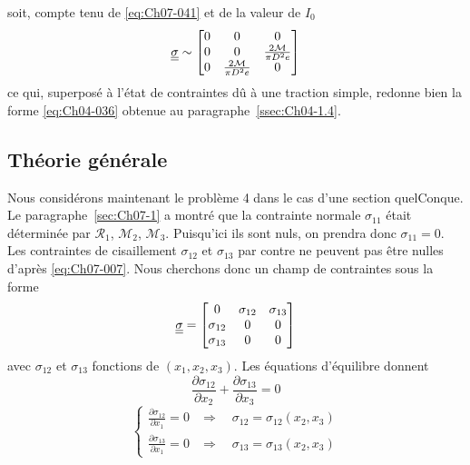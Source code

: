 soit, compte tenu de \eqref{eq:Ch07-041} et de la valeur de $I_0$
\begin{equation}
    \underline{\underline{\sigma}} \sim
    \begin{bmatrix}
        0 & 0 & 0 \\
        0 & 0 & \frac{2\mathcal{M}}{\pi D^2 e} \\
        0 & \frac{2\mathcal{M}}{\pi D^2 e} & 0
    \end{bmatrix}
    \label{eq:Ch07-047}
\end{equation}
ce qui, superposé à l'état de contraintes dû à une traction simple, redonne bien la forme \eqref{eq:Ch04-036} obtenue au paragraphe~\ref{ssec:Ch04-1.4}.
\subsection{Théorie générale} \label{ssec:Ch07-2.2}
Nous considérons maintenant le problème 4 dans le cas d'une section quelConque.
Le paragraphe~\ref{sec:Ch07-1} a montré que la contrainte normale $\sigma_{11}$ était déterminée par $\mathcal{R}_1$, $\mathcal{M}_2$, $\mathcal{M}_3$.
Puisqu'ici ils sont nuls, on prendra donc $\sigma_{11}=0$.
Les contraintes de cisaillement $\sigma_{12}$ et $\sigma_{13}$ par contre ne peuvent pas être nulles d'après \eqref{eq:Ch07-007}.
Nous cherchons donc un champ de contraintes sous la forme
\begin{equation}
    \underline{\underline{\sigma}} = 
    \begin{bmatrix}
        0 & \sigma_{12} & \sigma_{13} \\
        \sigma_{12} & 0 & 0\\
        \sigma_{13} & 0 & 0
    \end{bmatrix}
    \label{eq:Ch07-048}
\end{equation}
avec $\sigma_{12}$ et $\sigma_{13}$ fonctions de $\left( x_1, x_2, x_3 \right)$.
Les équations d'équilibre donnent
\begin{equation}
    \frac{\partial \sigma_{12}}{\partial x_2} + \frac{\partial \sigma_{13}}{\partial x_3} = 0
    \label{eq:Ch07-049}
\end{equation}
\begin{equation}
    \begin{cases}
        \frac{\partial \sigma_{12}}{\partial x_1} = 0 & \Rightarrow \quad \sigma_{12} = \sigma_{12} \left( x_2, x_3 \right) \\
        \frac{\partial \sigma_{13}}{\partial x_1} = 0 & \Rightarrow \quad \sigma_{13} = \sigma_{13} \left( x_2, x_3 \right)
    \end{cases}
    \label{eq:Ch07-050}
\end{equation}
